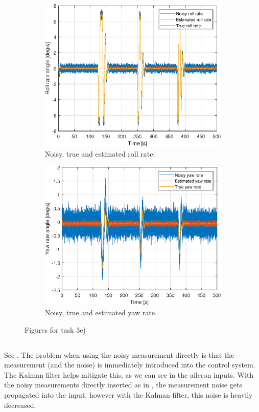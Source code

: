 \begin{figure}[ht]
\begin{subfigure}[b]{0.45\textwidth}
		\includegraphics[width=\textwidth]{figures/3e/roll_rate_p.eps}
		\caption{Noisy, true and estimated roll rate. }
		\label{fig:3e_roll_rate_p}
	\end{subfigure}
	\begin{subfigure}[b]{0.45\textwidth}
		\includegraphics[width=\textwidth]{figures/3e/yaw_rate_r.eps}
		\caption{Noisy, true and estimated yaw rate. }
		\label{fig:3e_yaw_rate_r}
	\end{subfigure}
	\caption{Figures for task 3e)}\label{fig:3e}
\end{figure}

\subsection{} %
See . The problem when using the noisy measurement directly is that the measurement (and the noise) is immediately introduced into the control system. The Kalman filter helps mitigate this, as we can see in the aileron inputs. With the noisy measurements directly inserted as in , the measurement noise gets propagated into the input, however with the Kalman filter, this noise is heavily decreased.

